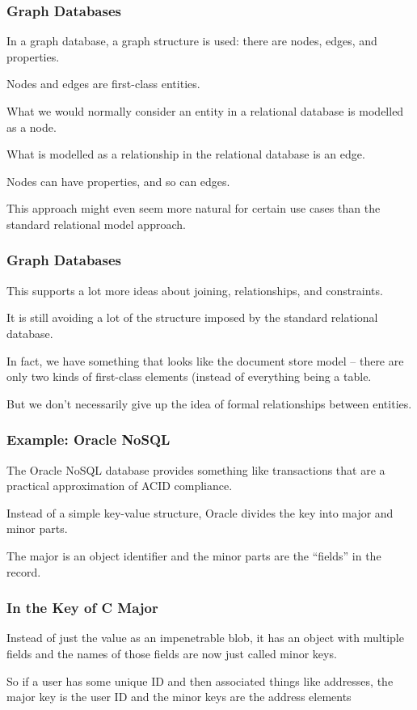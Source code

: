 \begin{frame}
\frametitle{Graph Databases}

In a graph database, a graph structure is used: there are nodes, edges, and properties. 

Nodes and edges are first-class entities. 

What we would normally consider an entity in a relational database is modelled as a node. 

What is modelled as a relationship in the relational database is an edge. 

Nodes can have properties, and so can edges. 

This approach might even seem more natural for certain use cases than the standard relational model approach. 


\end{frame}



\begin{frame}
\frametitle{Graph Databases}

This supports a lot more ideas about joining, relationships, and constraints. 

It is still avoiding a lot of the structure imposed by the standard relational database.

In fact, we have something that looks like the document store model -- there are only two kinds of first-class elements (instead of everything being a table.  

But we don't necessarily give up the idea of formal relationships between entities.


\end{frame}



\begin{frame}
\frametitle{Example: Oracle NoSQL}

The Oracle NoSQL database provides something like transactions that are a practical approximation of ACID compliance. 

Instead of a simple key-value structure, Oracle divides the key into major and minor parts. 

The major is an object identifier and the minor parts are the ``fields'' in the record. 

\end{frame}


\begin{frame}
\frametitle{In the Key of C Major}

Instead of just the value as an impenetrable blob, it has an object with multiple fields and the names of those fields are now just called minor keys. 

So if a user has some unique ID and then associated things like addresses, the major key is the user ID and the minor keys are the address elements


\end{frame}




